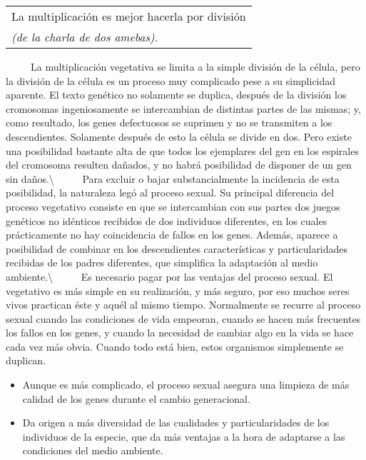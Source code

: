 \begin{longtable}[]{@{}l@{}}
\toprule
La multiplicación es mejor hacerla por división\tabularnewline
\emph{(de la charla de dos amebas).}\tabularnewline
\bottomrule
\end{longtable}

~ ~ ~ La multiplicación vegetativa se limita a la simple división de la
célula, pero la división de la célula es un proceso muy complicado pese
a su simplicidad aparente. El texto genético no solamente se duplica,
después de la división los cromosomas ingeniosamente se intercambian de
distintas partes de las mismas; y, como resultado, los genes defectuosos
se suprimen y no se transmiten a los descendientes. Solamente después de
esto la célula se divide en dos. Pero existe una posibilidad bastante
alta de que todos los ejemplares del gen en los espirales del cromosoma
resulten dañados, y no habrá posibilidad de disponer de un gen sin
daños.\textbackslash{} ~ ~ ~ Para excluir o bajar substancialmente la
incidencia de esta posibilidad, la naturaleza legó al proceso sexual. Su
principal diferencia del proceso vegetativo consiste en que se
intercambian con sus partes dos juegos genéticos no idénticos recibidos
de dos individuos diferentes, en los cuales prácticamente no hay
coincidencia de fallos en los genes. Además, aparece a posibilidad de
combinar en los descendientes características y particularidades
recibidas de los padres diferentes, que simplifica la adaptación al
medio ambiente.\textbackslash{} ~ ~ ~ Es necesario pagar por las
ventajas del proceso sexual. El vegetativo es más simple en su
realización, y más seguro, por eso muchos seres vivos practican éste y
aquél al mismo tiempo. Normalmente se recurre al proceso sexual cuando
las condiciones de vida empeoran, cuando se hacen más frecuentes los
fallos en los genes, y cuando la necesidad de cambiar algo en la vida se
hace cada vez más obvia. Cuando todo está bien, estos organismos
simplemente se duplican.

\begin{itemize}
\tightlist
\item
  Aunque es más complicado, el proceso sexual asegura una limpieza de
  más calidad de los genes durante el cambio generacional.
\item
  Da origen a más diversidad de las cualidades y particularidades de los
  individuos de la especie, que da más ventajas a la hora de adaptarse a
  las condiciones del medio ambiente.
\end{itemize}

\protect\hypertarget{M3}{}{}


